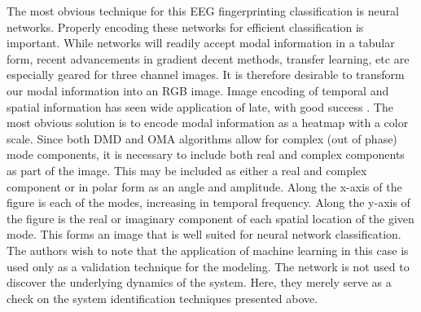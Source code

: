 The most obvious technique for this EEG fingerprinting classification is neural networks. Properly encoding these networks for efficient classification is important. While networks will readily accept modal information in a tabular form, recent advancements in gradient decent methods, transfer learning, etc are especially geared for three channel images. It is therefore desirable to transform our modal information into an RGB image. Image encoding of temporal and spatial information has seen wide application of late, with good success \cite{ke2020intersected, venugopal2020unboxing, bruno2019using}. The most obvious solution is to encode modal information as a heatmap with a color scale. Since both DMD and OMA algorithms allow for complex (out of phase) mode components, it is necessary to include both real and complex components as part of the image. This may be included as either a real and complex component or in polar form as an angle and amplitude. Along the x-axis of the figure is each of the modes, increasing in temporal frequency. Along the y-axis of the figure is the real or imaginary component of each spatial location of the given mode. This forms an image that is well suited for neural network classification. The authors wish to note that the application of machine learning in this case is used only as a validation technique for the modeling. The network is not used to discover the underlying dynamics of the system. Here, they merely serve as a check on the system identification techniques presented above.

